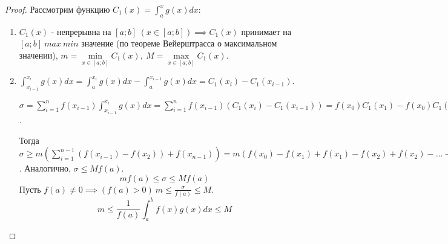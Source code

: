 \documentclass{report}
\theoremstyle{definition}
\begin{document}
\begin{proof}
  Рассмотрим функцию $C_{1}(x) = \int_{a}^{x}g(x)dx$:
  \begin{enumerate}
    \item $C_{1}(x)$ - непрерывна на $[a;b] \ (x\in[a;b]) \implies C_{1}(x)$ принимает на $[a;b]
    \ max \ min$ значение (по теореме Вейерштрасса о максимальном значении), $m = \underset
    {x\in[a;b]}{\min}C_{1}(x), \ M = \underset{x\in[a;b]}{\max} C_{1}(x)$.
    \item $\int_{x_{i-1}}^{x_{i}}g(x)dx = \int_{a}^{x_{i}}g(x)dx - \int_{a}^{x_{i-1}}g(x)dx =
    C_{1}(x_{i}) - C_{1}(x_{i-1})$.

    $\sigma = \sum_{i=1}^{n}f(x_{i-1})\int_{x_{i-1}}^{x_{i}}g(x)dx = \sum_{i=1}^{n}f(x_{i-1})
    (C_{1}(x_{i}) - C_{1}(x_{i-1})) = f(x_{0}) C_{1}(x_{1}) - f(x_{0})C_{1}(x_{0}) + 
    f(x_{1}) C_{1}(x_{2}) - f(x_{1}) C_{1}(x_{1}) + \ldots + f(x_{n-2})C_{1}(x_{n-1}) - 
    f(x_{n-2}) C_{1}(x_{n-2}) + f(x_{n-1})C_{1}(x_{n}) - f(x_{n-1})C_{1}(x_{n-1}) = 
    \sum_{i=1}^{n-1} C_{1}(x_{i})(f(x_{i-1}) - f(x_{i})) + f(x_{n-1})C_{1}(x_{n})$.

    Тогда $\sigma \geqslant m (\sum_{i=1}^{n-1}(f(x_{i-1}) - f(x_{2})) + f(x_{n-1})) =
    m(f(x_{0}) - f(x_{1}) + f(x_{1}) - f(x_{2}) + f(x_{2}) - \ldots - f(x_{n-1}) + f(x_{n-1}))
    = mf(a)$. Аналогично, $\sigma \leqslant Mf(a)$.
    \begin{equation*}
      mf(a) \leqslant \sigma \leqslant Mf(a)
    \end{equation*}
    Пусть $f(a) \ne 0 \implies (f(a) > 0) \ m \leqslant \frac{\sigma}{f(a)} \leqslant M$.
    \begin{equation*}
      m \leqslant \frac{1}{f(a)}\int_{a}^{b}f(x)g(x)dx \leqslant M
    \end{equation*}
  \end{enumerate}
\end{proof} 
\end{document}
